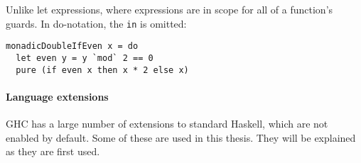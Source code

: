 Unlike let expressions, where expressions are in scope for all of a function's
guards.  In do-notation, the \verb|in| is omitted:

\begin{verbatim}
monadicDoubleIfEven x = do
  let even y = y `mod` 2 == 0
  pure (if even x then x * 2 else x)
\end{verbatim}

\paragraph{Language extensions}
GHC has a large number of extensions to standard Haskell, which are not enabled
by default.  Some of these are used in this thesis.  They will be explained as
they are first used.
